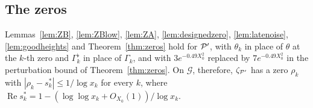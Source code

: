 \subsection{The zeros}
\begin{lemma}[Zeros of $\PP'$]\label{lem:onezero-zeros}
Lemmas~\ref{lem:ZB}, \ref{lem:ZBlow}, \ref{lem:ZA}, \ref{lem:designedzero}, \ref{lem:latenoise}, \ref{lem:goodheights} and
Theorem~\ref{thm:zeros} hold for $\PP'$, with $\theta_k$ in place of $\theta$ at the $k$-th zero and $\Gamma_k^\flat$ in place of $\Gamma_k$, and
with $3e^{-0.49X_0^2}$ replaced by $7e^{-0.49X_0^2}$ in the perturbation bound of Theorem~\ref{thm:zeros}. On $\mathcal G$, therefore,
$\zeta_{\mathcal{P}'}$ has a zero $\rho_k$ with $|\rho_k-s_k^*|\le1/\log x_k$ for every $k$, where
$\operatorname{Re}s_k^*=1-(\log\log x_k+O_{X_0}(1))/\log x_k$.
\end{lemma}

